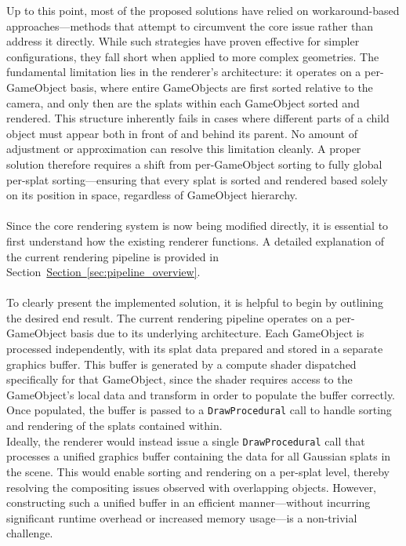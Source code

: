 \documentclass[12pt]{article}
\begin{document}
Up to this point, most of the proposed solutions have relied on workaround-based approaches—methods that attempt to circumvent the core issue rather than address it directly. While such strategies have proven effective for simpler configurations, they fall short when applied to more complex geometries. The fundamental limitation lies in the renderer’s architecture: it operates on a per-GameObject basis, where entire GameObjects are first sorted relative to the camera, and only then are the splats within each GameObject sorted and rendered. This structure inherently fails in cases where different parts of a child object must appear both in front of and behind its parent. No amount of adjustment or approximation can resolve this limitation cleanly. A proper solution therefore requires a shift from per-GameObject sorting to fully global per-splat sorting—ensuring that every splat is sorted and rendered based solely on its position in space, regardless of GameObject hierarchy.\\\\
Since the core rendering system is now being modified directly, it is essential to first understand how the existing renderer functions. A detailed explanation of the current rendering pipeline is provided in Section~\hyperref[sec:pipeline_overview]{Section~\ref*{sec:pipeline_overview}}.
\\\\
To clearly present the implemented solution, it is helpful to begin by outlining the desired end result. The current rendering pipeline operates on a per-GameObject basis due to its underlying architecture. Each GameObject is processed independently, with its splat data prepared and stored in a separate graphics buffer. This buffer is generated by a compute shader dispatched specifically for that GameObject, since the shader requires access to the GameObject's local data and transform in order to populate the buffer correctly. Once populated, the buffer is passed to a \texttt{DrawProcedural} call to handle sorting and rendering of the splats contained within.\\
Ideally, the renderer would instead issue a single \texttt{DrawProcedural} call that processes a unified graphics buffer containing the data for all Gaussian splats in the scene. This would enable sorting and rendering on a per-splat level, thereby resolving the compositing issues observed with overlapping objects. However, constructing such a unified buffer in an efficient manner—without incurring significant runtime overhead or increased memory usage—is a non-trivial challenge.
\end{document}
